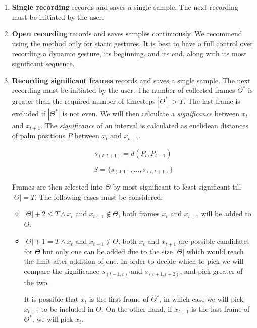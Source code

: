 \begin{enumerate}
	\item \textbf{Single recording} records and saves a single sample. The next recording must be initiated by the user.
    \item \textbf{Open recording} records and saves samples continuously. We recommend using the method only for static gestures. It is best to have a full control over recording a dynamic gesture, its beginning, and its end, along with its most significant sequence.
    \item \textbf{Recording significant frames} records and saves a single sample. The next recording must be initiated by the user. The number of collected frames $\Theta^*$ is greater than the required number of timesteps $|\Theta^*| > T$. The last frame is excluded if $|\Theta^*|$ is not even. We will then calculate a \textit{significance} between $x_t$ and $x_{t+1}$.
    The \textit{significance} of an interval is calculated as euclidean distances of palm positions $P$ between $x_t$ and $x_{t+1}$.

    \begin{equation}
        {s_{(t, t+1)} = d(P_{t}, P_{t+1})}
    \end{equation}

    \begin{equation}
        {S = \{s_{(0, 1)}, ...,s_{(t, t+1)}\}}
    \end{equation}

    Frames are then selected into $\Theta$ by most significant to least significant till $|\Theta| = T$. The following cases must be considered:
    \begin{itemize}
        \item $|\Theta| + 2 \leq T \land x_t$ and $x_{t+1} \notin \Theta$, both frames $x_t$ and $x_{t+1}$ will be added to $\Theta$.
        \item $|\Theta| + 1 = T \land x_t$ and $x_{t+1} \notin \Theta$, both $x_t$ and $x_{t+1}$ are possible candidates for $\Theta$ but only one can be added due to the size $|\Theta|$ which would reach the limit after addition of one. In order to decide which to pick we will compare the significance $s_{(t-1, t)}$ and $s_{(t+1, t+2)}$, and pick greater of the two.
        
        It is possible that $x_t$ is the first frame of $\Theta^*$, in which case we will pick $x_{t+1}$ to be included in $\Theta$. On the other hand, if $x_{t+1}$ is the last frame of $\Theta^*$, we will pick $x_t$.
        

\end{itemize}
\end{enumerate}

